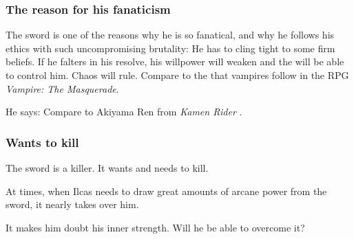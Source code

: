 \subsubsection{The reason for his fanaticism}
The sword is one of the reasons why he is so fanatical, and why he follows his ethics with such uncompromising brutality: 
He has to cling tight to some firm beliefs. 
If he falters in his resolve, his willpower will weaken and the \daemons{} will be able to control him. 
Chaos will rule. 
Compare to the  that vampires follow in the RPG \emph{Vampire: The Masquerade}. 

He says:  
Compare to Akiyama Ren from \emph{Kamen Rider \Ryuki}. 





\subsubsection{Wants to kill}
The sword is a killer. 
It wants and needs to kill. 


At times, when Ilcas needs to draw great amounts of arcane power from the sword, it nearly takes over him. 


It makes him doubt his inner strength. Will he be able to overcome it?



